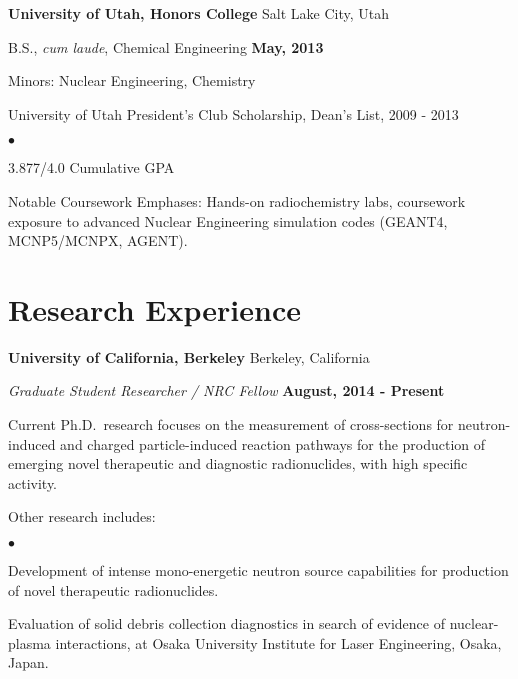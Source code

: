 \documentclass[margin,line]{res}
\newenvironment{list1}{
  \begin{list}{\ding{113}}{%
      \setlength{\itemsep}{0in}
      \setlength{\parsep}{0in} \setlength{\parskip}{0in}
      \setlength{\topsep}{0in} \setlength{\partopsep}{0in} 
      \setlength{\leftmargin}{0.17in}}}{\end{list}}
\newenvironment{list2}{
  \begin{list}{$\bullet$}{%
      \setlength{\itemsep}{0in}
      \setlength{\parsep}{0in} \setlength{\parskip}{0in}
      \setlength{\topsep}{0in} \setlength{\partopsep}{0in} 
      \setlength{\leftmargin}{0.2in}}}{\end{list}}
\begin{document}
\begin{resume}
{\bf University of Utah, Honors College}  \hfill{ Salt Lake City, Utah}

\begin{list1}
\item[] B.S., \textit{cum laude}, Chemical Engineering  \hfill{\bf May, 2013}
\item[] Minors: Nuclear Engineering, Chemistry
\item[] University of Utah President's Club Scholarship, Dean's List, 2009 - 2013
\begin{list2}
\vspace*{.05in}
\item 3.877/4.0 Cumulative GPA
\item Notable Coursework Emphases: Hands-on 
radiochemistry labs, coursework  exposure to advanced Nuclear Engineering simulation codes
(GEANT4, MCNP5/MCNPX, AGENT).
\end{list2}
\end{list1}





\section{\sc Research Experience}
{\bf University of California, Berkeley} \hfill{ Berkeley, California}

\vspace*{-.05in}
{\em Graduate Student Researcher / NRC Fellow} \hfill {\bf August, 2014 - Present}

\begin{list1}
\item[] Current Ph.D.~research focuses on the measurement of cross-sections for neutron-induced and charged particle-induced reaction pathways for the production of emerging novel therapeutic and diagnostic radionuclides, with high specific activity.  
\item[] Other research includes: 
\begin{list2}
\item[] Development of intense mono-energetic neutron source capabilities for production of novel therapeutic radionuclides.
\item[] Evaluation of solid debris collection diagnostics in search 
of evidence of nuclear-plasma interactions, at Osaka University Institute for Laser Engineering, Osaka, Japan.
\end{list2}
\end{list1}






\end{resume}
\end{document}
